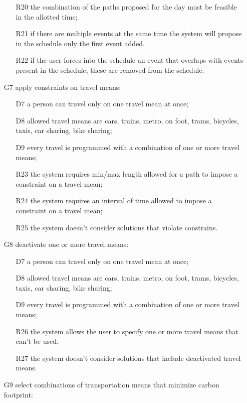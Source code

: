 \begin{itemize}
\begin{itemize}
	\newline
	\item[R20] the combination of the paths proposed for the day must be feasible in the allotted time;
	\item[R21] if there are multiple events at the same time the system will propose in the schedule only the first event added.
	\item[R22] if the user forces into the schedule an event that overlaps with events present in the schedule, these are removed from the schedule.
	\end{itemize}
\item[G7] apply constraints on travel means:
	\begin{itemize}
	\item[D7] a person can travel only on one travel mean at once; 
	\item[D8] allowed travel means are cars, trains, metro, on foot, trams, bicycles, taxis, car sharing, bike sharing;	
	\item[D9] every travel is programmed with a combination of one or more travel means;
	\newline
	\item[R23] the system requires min/max length allowed for a path to impose a constraint on a travel mean;
	\item[R24] the system requires an interval of time allowed to impose a constraint on a travel mean;
	\item[R25] the system doesn’t consider solutions that violate constrains.
	\end{itemize}
\item[G8] deactivate one or more travel means:
	\begin{itemize}
	\item[D7] a person can travel only on one travel mean at once; 
	\item[D8] allowed travel means are cars, trains, metro, on foot, trams, bicycles, taxis, car sharing, bike sharing;	
	\item[D9] every travel is programmed with a combination of one or more travel means;
	\newline
	\item[R26] the system allows the user to specify one or more travel means that can’t be used.
	\item[R27] the system doesn’t consider solutions that include deactivated travel means.
	\end{itemize}
\item[G9] select combinations of transportation means that minimize carbon footprint:

\end{itemize}
